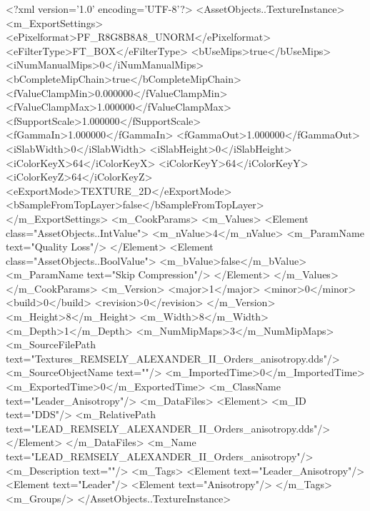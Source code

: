 <?xml version='1.0' encoding='UTF-8'?>
<AssetObjects..TextureInstance>
  <m_ExportSettings>
    <ePixelformat>PF_R8G8B8A8_UNORM</ePixelformat>
    <eFilterType>FT_BOX</eFilterType>
    <bUseMips>true</bUseMips>
    <iNumManualMips>0</iNumManualMips>
    <bCompleteMipChain>true</bCompleteMipChain>
    <fValueClampMin>0.000000</fValueClampMin>
    <fValueClampMax>1.000000</fValueClampMax>
    <fSupportScale>1.000000</fSupportScale>
    <fGammaIn>1.000000</fGammaIn>
    <fGammaOut>1.000000</fGammaOut>
    <iSlabWidth>0</iSlabWidth>
    <iSlabHeight>0</iSlabHeight>
    <iColorKeyX>64</iColorKeyX>
    <iColorKeyY>64</iColorKeyY>
    <iColorKeyZ>64</iColorKeyZ>
    <eExportMode>TEXTURE_2D</eExportMode>
    <bSampleFromTopLayer>false</bSampleFromTopLayer>
  </m_ExportSettings>
  <m_CookParams>
    <m_Values>
      <Element class="AssetObjects..IntValue">
        <m_nValue>4</m_nValue>
        <m_ParamName text="Quality Loss"/>
      </Element>
      <Element class="AssetObjects..BoolValue">
        <m_bValue>false</m_bValue>
        <m_ParamName text="Skip Compression"/>
      </Element>
    </m_Values>
  </m_CookParams>
  <m_Version>
    <major>1</major>
    <minor>0</minor>
    <build>0</build>
    <revision>0</revision>
  </m_Version>
  <m_Height>8</m_Height>
  <m_Width>8</m_Width>
  <m_Depth>1</m_Depth>
  <m_NumMipMaps>3</m_NumMipMaps>
  <m_SourceFilePath text="Textures\LEAD_REMSELY_ALEXANDER_II_Orders_anisotropy.dds"/>
  <m_SourceObjectName text=""/>
  <m_ImportedTime>0</m_ImportedTime>
  <m_ExportedTime>0</m_ExportedTime>
  <m_ClassName text="Leader_Anisotropy"/>
  <m_DataFiles>
    <Element>
      <m_ID text="DDS"/>
      <m_RelativePath text="LEAD_REMSELY_ALEXANDER_II_Orders_anisotropy.dds"/>
    </Element>
  </m_DataFiles>
  <m_Name text="LEAD_REMSELY_ALEXANDER_II_Orders_anisotropy"/>
  <m_Description text=""/>
  <m_Tags>
    <Element text="Leader_Anisotropy"/>
    <Element text="Leader"/>
    <Element text="Anisotropy"/>
  </m_Tags>
  <m_Groups/>
</AssetObjects..TextureInstance>

